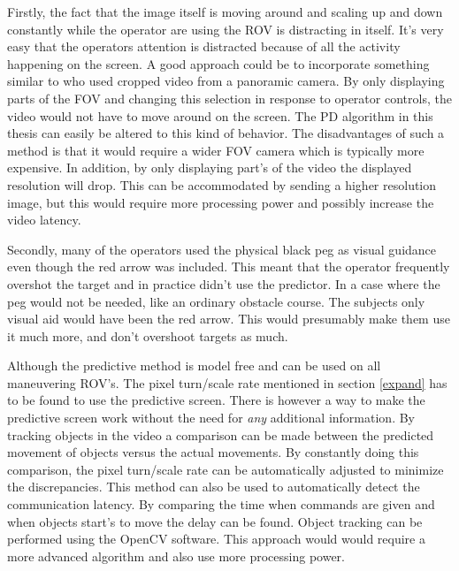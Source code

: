 Firstly, the fact that the image itself is moving around and scaling up and down constantly while the operator are using the ROV is distracting in itself. It's very easy that the operators attention is distracted because of all the activity happening on the screen. A good approach could be to incorporate something similar to \citet{Baldwin1999} who used cropped video from a panoramic camera. By only displaying parts of the FOV and changing this selection in response to operator controls, the video would not have to move around on the screen. The PD algorithm in this thesis can easily be altered to this kind of behavior. The disadvantages of such a method is that it would require a wider FOV camera which is typically more expensive. In addition, by only displaying part's of the video the displayed resolution will drop. This can be accommodated by sending a higher resolution image, but this would require more processing power and possibly increase the video latency.

Secondly, many of the operators used the physical black peg as visual guidance even though the red arrow was included. This meant that the operator frequently overshot the target and in practice didn't use the predictor. In a case where the peg would not be needed, like an ordinary obstacle course. The subjects only visual aid would have been the red arrow. This would presumably make them use it much more, and don't overshoot targets as much.

Although the predictive method is model free and can be used on all maneuvering ROV's. The pixel turn/scale rate mentioned in section \ref{expand} has to be found to use the predictive screen. There is however a way to make the predictive screen work without the need for \textit{any} additional information. By tracking objects in the video a comparison can be made between the predicted movement of objects versus the actual movements. By constantly doing this comparison, the pixel turn/scale rate can be automatically adjusted to minimize the discrepancies. This method can also be used to automatically detect the communication latency. By comparing the time when commands are given and when objects start's to move the delay can be found. Object tracking can be performed using the OpenCV software. This approach would would require a more advanced algorithm and also use more processing power.


